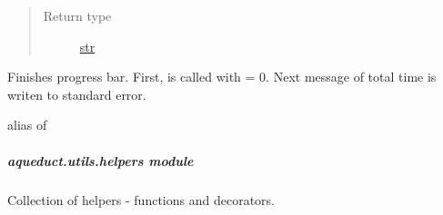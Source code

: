 \documentclass[a4paper,10pt,english]{sphinxmanual}
\begin{document}
\begin{fulllineitems}
\begin{fulllineitems}
\begin{quote}
\begin{description}
\item[{Return type}] \leavevmode
\href{http://docs.python.org/2/library/functions.html\#str}{str}

\end{description}\end{quote}

\end{fulllineitems}


\begin{fulllineitems}
\label{aqueduct.utils.clui:aqueduct.utils.clui.SimpleProgressBar.finish}
Finishes progress bar. First, {\hyperref[aqueduct.utils.clui:aqueduct.utils.clui.SimpleProgressBar.update]{}} is called with  = 0. Next message of total time
is writen to standard error.

\end{fulllineitems}


\end{fulllineitems}


\begin{fulllineitems}
\label{aqueduct.utils.clui:aqueduct.utils.clui.pbar}
alias of {\hyperref[aqueduct.utils.clui:aqueduct.utils.clui.SimpleProgressBar]{}}

\end{fulllineitems}


\begin{fulllineitems}
\label{aqueduct.utils.clui:aqueduct.utils.clui.get_str_timestamp}
\end{fulllineitems}



\subparagraph{aqueduct.utils.helpers module}
\label{aqueduct.utils.helpers:module-aqueduct.utils.helpers}\label{aqueduct.utils.helpers:aqueduct-utils-helpers-module}\label{aqueduct.utils.helpers::doc}
Collection of helpers - functions and decorators.
\end{document}
